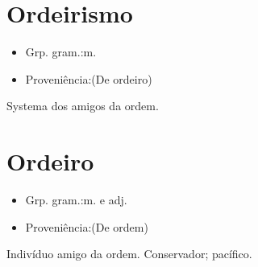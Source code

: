 \section{Ordeirismo}
\begin{itemize}
\item {Grp. gram.:m.}
\end{itemize}
\begin{itemize}
\item {Proveniência:(De \textunderscore ordeiro\textunderscore )}
\end{itemize}
Systema dos amigos da ordem.
\section{Ordeiro}
\begin{itemize}
\item {Grp. gram.:m.  e  adj.}
\end{itemize}
\begin{itemize}
\item {Proveniência:(De \textunderscore ordem\textunderscore )}
\end{itemize}
Indivíduo amigo da ordem.
Conservador; pacífico.
